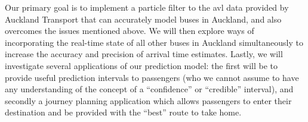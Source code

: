 \documentclass[12pt,a4paper]{article}
\newcommand{\pf}{particle filter}
\begin{document}
Our primary goal is to implement a \pf{} to the \gls{avl} data provided by Auckland Transport
that can accurately model buses in Auckland, 
and also overcomes the issues mentioned above.
We will then explore ways of incorporating the real-time state of all other buses in Auckland
simultaneously to increase the accuracy and precision of arrival time estimates.
Lastly, we will investigate several applications of our prediction model:
the first will be to provide useful prediction intervals to passengers
(who we cannot assume to have any understanding of the concept of a 
``confidence'' or ``credible'' interval),
and secondly a journey planning application which allows passengers to enter their destination
and be provided with the ``best'' route to take home.














\end{document}
